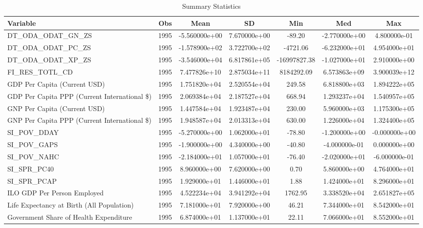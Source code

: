 \begin{table}
\centering
\caption{Summary Statistics}
\label{Sum_Stats}
\begin{tabular}{lcccccc}
\toprule
                                    Variable &  Obs &          Mean &           SD &          Min &           Med &           Max \\
\midrule
DT\_ODA\_ODAT\_GN\_ZS & 1995 & -5.560000e+00 & 7.670000e+00 & -89.20 & -2.770000e+00 & 4.800000e-01 \\
DT\_ODA\_ODAT\_PC\_ZS & 1995 & -1.578900e+02 & 3.722700e+02 & -4721.06 & -6.232000e+01 & 4.954000e+01 \\
DT\_ODA\_ODAT\_XP\_ZS & 1995 & -3.546000e+04 & 6.817861e+05 & -16997827.38 & -1.027000e+01 & 2.910000e+00 \\
FI\_RES\_TOTL\_CD & 1995 & 7.477826e+10 & 2.875034e+11 & 8184292.09 & 6.573863e+09 & 3.900039e+12 \\
GDP Per Capita (Current USD) & 1995 & 1.751820e+04 & 2.520554e+04 & 249.58 & 6.818800e+03 & 1.894222e+05 \\
GDP Per Capita PPP (Current International \$) & 1995 & 2.069384e+04 & 2.187527e+04 & 668.94 & 1.293237e+04 & 1.540957e+05 \\
GNP Per Capita (Current USD) & 1995 & 1.447584e+04 & 1.923487e+04 & 230.00 & 5.960000e+03 & 1.175300e+05 \\
GNP Per Capita PPP (Current International \$) & 1995 & 1.948587e+04 & 2.013313e+04 & 630.00 & 1.226000e+04 & 1.324400e+05 \\
SI\_POV\_DDAY & 1995 & -5.270000e+00 & 1.062000e+01 & -78.80 & -1.200000e+00 & -0.000000e+00 \\
SI\_POV\_GAPS & 1995 & -1.900000e+00 & 4.340000e+00 & -40.80 & -4.000000e-01 & 0.000000e+00 \\
SI\_POV\_NAHC & 1995 & -2.184000e+01 & 1.057000e+01 & -76.40 & -2.020000e+01 & -6.000000e-01 \\
SI\_SPR\_PC40 & 1995 & 8.960000e+00 & 7.620000e+00 & 0.70 & 5.860000e+00 & 4.764000e+01 \\
SI\_SPR\_PCAP & 1995 & 1.929000e+01 & 1.446000e+01 & 1.88 & 1.424000e+01 & 8.296000e+01 \\
ILO GDP Per Person Employed & 1995 & 4.522234e+04 & 3.941292e+04 & 1762.95 & 3.338520e+04 & 2.651827e+05 \\
Life Expectancy at Birth (All Population) & 1995 & 7.181000e+01 & 7.920000e+00 & 46.21 & 7.344000e+01 & 8.542000e+01 \\
Government Share of Health Expenditure & 1995 & 6.874000e+01 & 1.137000e+01 & 22.11 & 7.066000e+01 & 8.552000e+01 \\
\bottomrule
\end{tabular}
\end{table}
